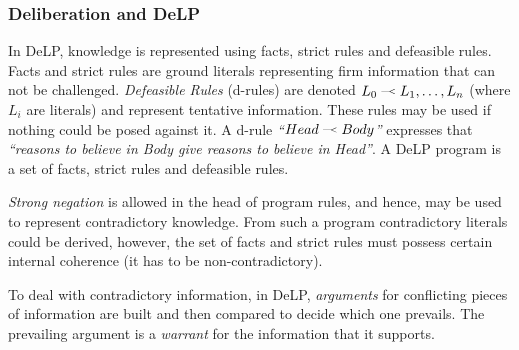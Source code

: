 





    
    
    


\subsubsection{Deliberation and DeLP}
    \newcommand{\drule}[2]{\mbox{$ #1\; \defleftarrow \; #2$}}
    \newcommand{\defleftarrow}{{\raise1.5pt\hbox{\tiny\defleft}}}
    \newcommand{\defleft}{\mbox{---\hspace{-1.5pt}\raise.05pt\hbox{$<$}}}
    In DeLP\cite{Garcia:2004a}, knowledge is represented using facts, strict rules
    and defeasible rules. Facts and strict rules are ground literals representing
    firm information that can not be challenged. \textit{Defeasible Rules}
    (d-rules) are denoted $\drule{L_0}{L_1, \ldots, L_n}$ (where $L_i$ are literals)
    and represent tentative information. These rules may be used if nothing could
    be posed against it. A d-rule \textit{``\drule{Head}{Body}''} expresses that
    \textit{``reasons to believe in Body give reasons to believe in Head''}. A DeLP
    program is a set of facts, strict rules and defeasible rules. 

    {\it Strong negation} is allowed in the head of program rules, and hence, may
    be used to represent contradictory knowledge. From such a program contradictory
    literals could be derived, however,  the set of facts and strict rules must
    possess certain internal coherence (it has to be non-contradictory). 

    To deal with contradictory information, in DeLP, \emph{arguments} for
    conflicting pieces of information are built and then compared to decide which
    one prevails. The prevailing argument is a \emph{warrant} for the information
    that it supports.

